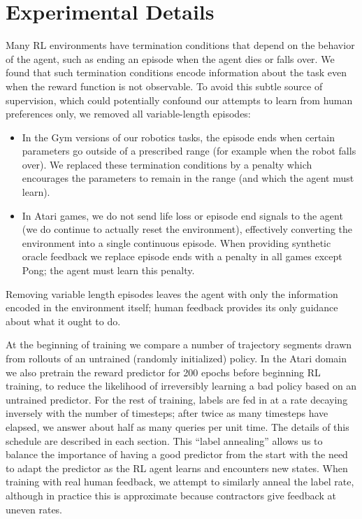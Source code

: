 \documentclass{article}
\begin{document}




\newpage\appendix
\section{Experimental Details}
\label{app:details}

Many RL environments have termination conditions that depend on the behavior of the agent, such as ending an episode when the agent dies or falls over.
We found that such termination conditions encode information about the task even when the reward function is not observable.
To avoid this subtle source of supervision, which could potentially confound our attempts to learn from human preferences only, we removed all variable-length episodes:
\begin{itemize}
    \item In the Gym versions of our robotics tasks, the episode ends when certain parameters go outside of a prescribed range (for example when the robot falls over). We replaced these termination conditions by a penalty which encourages the parameters to remain in the range (and which the agent must learn).
    \item In Atari games, we do not send life loss or episode end signals to the agent (we do continue to actually reset the environment), effectively converting the environment into a single continuous episode. When providing synthetic oracle feedback we replace episode ends with a penalty in all games except Pong; the agent must learn this penalty.
\end{itemize}
Removing variable length episodes leaves the agent with only the information encoded in the environment itself;
human feedback provides its only guidance about what it ought to do.

At the beginning of training we compare a number of trajectory segments drawn from rollouts of an untrained (randomly initialized) policy.
In the Atari domain we also pretrain the reward predictor for 200 epochs before beginning RL training, to reduce the likelihood of irreversibly learning a bad policy based on an untrained predictor. 
For the rest of training, labels are fed in at a rate decaying inversely with the number of timesteps;
after twice as many timesteps have elapsed,
we answer about half as many queries per unit time.
The details of this schedule are described in each section.
This ``label annealing'' allows us to balance the importance of having a good predictor from the start
with the need to adapt the predictor as the RL agent learns and encounters new states.
When training with real human feedback, we attempt to similarly anneal the label rate,
although in practice this is approximate because contractors give feedback at uneven rates.
\end{document}
